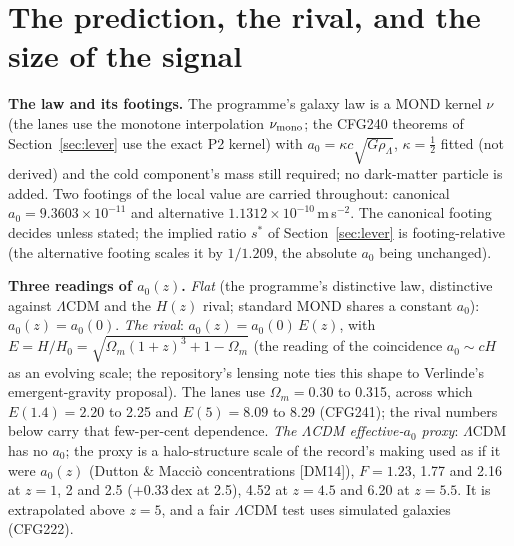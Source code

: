 \documentclass[10pt]{article}
\begin{document}
\section{The prediction, the rival, and the size of the signal}\label{sec:pred}

\textbf{The law and its footings.} The programme's galaxy law is a MOND kernel $\nu$ (the lanes use the monotone interpolation $\nu_{\rm mono}$; the CFG240 theorems of Section~\ref{sec:lever} use the exact P2 kernel) with $a_0=\kappa c\sqrt{G\rho_\Lambda}$, $\kappa=\tfrac12$ fitted (not derived) and the cold component's mass still required; no dark-matter particle is added. Two footings of the local value are carried throughout: canonical $a_0=9.3603\times10^{-11}$ and alternative $1.1312\times10^{-10}$\,m\,s$^{-2}$. The canonical footing decides unless stated; the implied ratio $s^*$ of Section~\ref{sec:lever} is footing-relative (the alternative footing scales it by $1/1.209$, the absolute $a_0$ being unchanged).

\textbf{Three readings of $a_0(z)$.} \emph{Flat} (the programme's distinctive law, distinctive against $\Lambda$CDM and the $H(z)$ rival; standard MOND shares a constant $a_0$): $a_0(z)=a_0(0)$. \emph{The rival}: $a_0(z)=a_0(0)\,E(z)$, with $E=H/H_0=\sqrt{\Omega_m(1+z)^3+1-\Omega_m}$ (the reading of the coincidence $a_0\sim cH$ as an evolving scale; the repository's lensing note ties this shape to Verlinde's emergent-gravity proposal). The lanes use $\Omega_m=0.30$ to 0.315, across which $E(1.4)=2.20$ to 2.25 and $E(5)=8.09$ to 8.29 (CFG241); the rival numbers below carry that few-per-cent dependence. \emph{The $\Lambda$CDM effective-$a_0$ proxy}: $\Lambda$CDM has no $a_0$; the proxy is a halo-structure scale of the record's making used as if it were $a_0(z)$ (Dutton \& Macci\`o concentrations [DM14]), $F=1.23$, 1.77 and 2.16 at $z=1$, 2 and 2.5 ($+0.33$\,dex at 2.5), 4.52 at $z=4.5$ and 6.20 at $z=5.5$. It is extrapolated above $z=5$, and a fair $\Lambda$CDM test uses simulated galaxies (CFG222).
\end{document}
